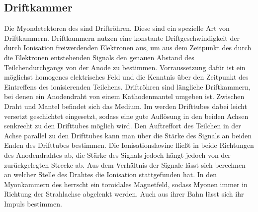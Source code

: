 \subsection{Driftkammer}\label{sec:drift}
Die Myondetektoren des \atlas sind Driftröhren. Diese sind ein spezielle Art von Driftkammern. 
Driftkammern nutzen eine konstante Driftgeschwindigkeit der durch Ionisation freiwerdenden Elektronen aus, um aus dem Zeitpunkt des durch die Elektronen entstehenden Signals den genauen Abstand des Teilchendurchgangs von der Anode zu bestimmen. Vorraussetzung dafür ist ein möglichst homogenes elektrisches Feld und die Kenntnis über den Zeitpunkt des Eintreffens des ionisierenden Teilchens.  
Driftröhren sind längliche Driftkammern, bei denen ein Anodendraht von einem Kathodenmantel umgeben ist. Zwischen Draht und Mantel befindet sich das Medium. 
Im \atlas werden Drifttubes dabei leicht versetzt geschichtet eingesetzt, sodass eine gute Auflösung in den beiden Achsen senkrecht zu den Drifttubes möglich wird. Den Auftreffort des Teilchen in der Achse parallel zu den Drifttubes kann man über die Stärke des Signals an beiden Enden des Drifttubes bestimmen. Die Ionisationslawine fließt in beide Richtungen des Anodendrahtes ab, die Stärke des Signals jedoch hängt jedoch von der zurückgelegten Strecke ab. Aus dem Verhältnis der Signale lässt sich berechnen an welcher Stelle des Drahtes die Ionisation stattgefunden hat.
In den Myonkammern des \atlas herrscht ein toroidales Magnetfeld, sodass Myonen immer in Richtung der Strahlachse abgelenkt werden. Auch aus ihrer Bahn lässt sich ihr Impuls bestimmen.



